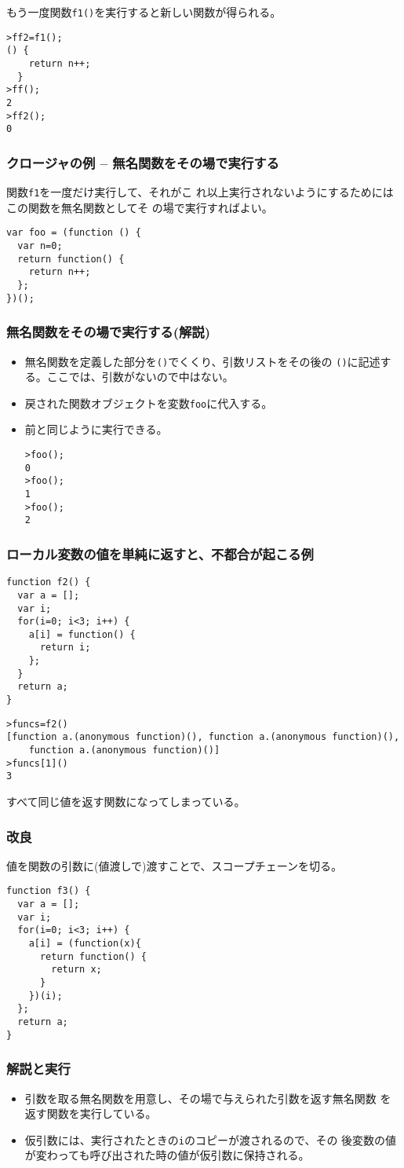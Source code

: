\begin{frame}[containsverbatim]
 もう一度関数\texttt{f1()}を実行すると新しい関数が得られる。
\begin{Verbatim}
>ff2=f1();
() {
    return n++;
  }
>ff();
2
>ff2();
0
\end{Verbatim}
\end{frame}
\begin{frame}[containsverbatim]
\frametitle{クロージャの例 -- 無名関数をその場で実行する}
関数\texttt{f1}を一度だけ実行して、それがこ
        れ以上実行されないようにするためにはこの関数を無名関数としてそ
 の場で実行すればよい。
\begin{Verbatim}
var foo = (function () {
  var n=0;
  return function() {
    return n++;
  };
})();
\end{Verbatim}
\end{frame}
\begin{frame}[containsverbatim]
\frametitle{無名関数をその場で実行する(解説)}
\begin{itemize}
 \item 無名関数を定義した部分を\texttt{()}でくくり、引数リストをその後の
       \texttt{()}に記述する。ここでは、引数がないので中はない。
   \item 戻された関数オブジェクトを変数\texttt{foo}に代入する。
  \item 前と同じように実行できる。
\begin{Verbatim}
>foo();
0
>foo();
1
>foo();
2
\end{Verbatim}
\end{itemize}
\end{frame}
\begin{frame}[containsverbatim]
\frametitle{ローカル変数の値を単純に返すと、不都合が起こる例}
\begin{Verbatim}
function f2() {
  var a = [];
  var i;
  for(i=0; i<3; i++) {
    a[i] = function() {
      return i;
    };
  }
  return a;
}
\end{Verbatim}
\begin{Verbatim}
>funcs=f2()
[function a.(anonymous function)(), function a.(anonymous function)(),
    function a.(anonymous function)()]
>funcs[1]()
3
\end{Verbatim}
すべて同じ値を返す関数になってしまっている。
\end{frame}
\begin{frame}[containsverbatim]
\frametitle{改良}
値を関数の引数に(値渡しで)渡すことで、スコープチェーンを切る。
\begin{Verbatim}
function f3() {
  var a = [];
  var i;
  for(i=0; i<3; i++) {
    a[i] = (function(x){
      return function() {
        return x;
      }
    })(i);
  };
  return a;
}
\end{Verbatim}
\end{frame}
\begin{frame}[containsverbatim]
\frametitle{解説と実行}
\begin{itemize}
 \item 引数を取る無名関数を用意し、その場で与えられた引数を返す無名関数
       を返す関数を実行している。
 \item 仮引数には、実行されたときの\Verb+i+のコピーが渡されるので、その
       後変数の値が変わっても呼び出された時の値が仮引数に保持される。
\end{itemize}
\end{frame}
